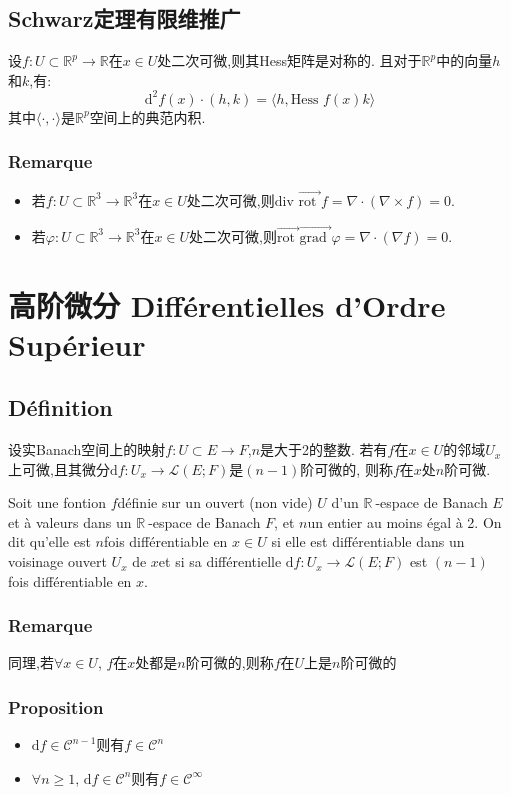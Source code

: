 \documentclass[12pt, a4paper, oneside]{ctexbook}
\newcommand{\di }{\text{d}}%
\newcommand{\R }{\mathbb{R}}%
\newcommand{\RR }{$\R\ $}%
\newcommand{\fai }{\varphi}%
\newcommand{\C }{\mathcal{C}}%
\newcommand{\x }{$x$}\newcommand{\xo }{$x_0$}
\newcommand{\n }{$n$}\newcommand{\f  }{$ f $}
\begin{document}
\subsection{Schwarz定理有限维推广}
  设$f:U\subset \R^p\rightarrow \R$在$x\in U$处二次可微,则其Hess矩阵是对称的.
  且对于$\R^p$中的向量$h$和$k$,有:
  $$
    \di^2f(x)\cdot(h,k)=\langle h,\text{Hess }f(x)k\rangle 
  $$
  其中$\langle \cdot,\cdot\rangle$是$\R^p$空间上的典范内积.
  \subsubsection{Remarque}
  \begin{itemize}
    \item 若$f:U\subset \R^3\rightarrow \R^3$在$x\in U$处二次可微,则$\text{div }\overrightarrow{\text{rot }} f=\nabla\cdot(\nabla\times f)=0$.
    \item 若$\fai:U\subset \R^3\rightarrow \R^3$在$x\in U$处二次可微,则$\overrightarrow{\text{rot }} \overrightarrow{\text{grad }} \fai=\nabla\cdot(\nabla f)=0$.
  \end{itemize}
\section{高阶微分 Différentielles d'Ordre Supérieur}
  \subsection{Définition}
  设实Banach空间上的映射$f:U\subset E\rightarrow F$,\n 是大于2的整数.
  若有\f 在$x\in U$的邻域$U_x$上可微,且其微分$\di f:U_x\rightarrow\mathcal{L}(E;F)$是$(n-1)$阶可微的,
  则称\f 在$x$处$n$阶可微.


  \indent
  Soit une fontion \f définie sur un ouvert (non vide) $U$ d'un \RR-espace de Banach $E$ et à valeurs dans un \RR-espace de Banach $F$, 
  et \n un entier au moins égal à 2. 
  On dit qu'elle est \n fois différentiable en $x \in U$ si elle est différentiable dans un voisinage ouvert $U_x$ de \x et
   si sa différentielle $\di f:U_x\rightarrow\mathcal{L}(E;F)$ est $(n-1)$ fois différentiable en \x.
  \subsubsection{Remarque}
  同理,若$\forall x\in U$, \f 在\x 处都是$n$阶可微的,则称\f 在$U$上是$n$阶可微的
  \subsubsection{Proposition}
  \begin{itemize}
    \item   $\di f\in\C^{n-1}$则有$ f\in\C^n$
    \item   $\forall n\ge 1,\,\di f\in\C^{n}$则有$f\in\C^\infty$
  \end{itemize}
\end{document}
